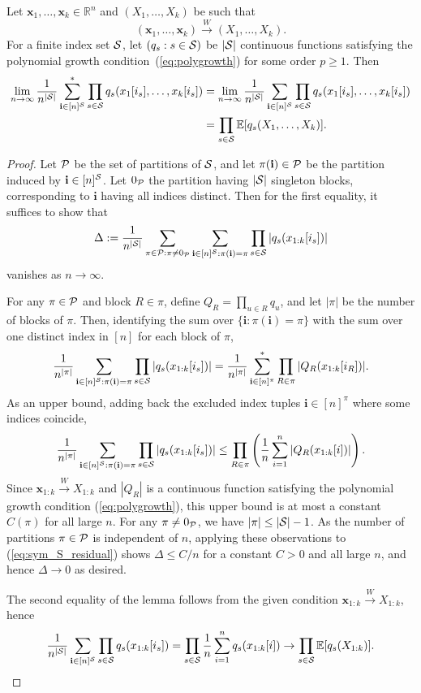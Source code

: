\documentclass[10pt,reqno]{amsart}
\def\x{\mathbf{x}}
\def\E{\mathbb{E}}
\def\R{\mathbb{R}}
\def\toW{\overset{W}{\to}}
\def\bi{\mathbf{i}}
\begin{document}
\begin{lemma}\label{lemma:distinctness}
Let $\x_1,\ldots,\x_k \in \R^n$ and $(X_1,\ldots,X_k)$ be such that
\[(\x_1,\ldots,\x_k) \toW (X_1,\ldots,X_k).\]
For a finite index set ${\mathcal{S}}$, let $(q_s:s \in {\mathcal{S}})$ be $|{\mathcal{S}}|$
continuous functions satisfying the polynomial
growth condition~(\ref{eq:polygrowth}) for some order $p \geq 1$. Then
\begin{align*}
\lim_{n \to \infty} \frac{1}{n^{|\cS|}}\sum_{\bi \in [n]^\cS}^*
\prod_{s \in \cS} q_s(x_1[i_s],\ldots,x_k[i_s])
&=\lim_{n \to \infty} \frac{1}{n^{|\cS|}}\sum_{\bi \in [n]^\cS}
\prod_{s \in \cS} q_s(x_1[i_s],\ldots,x_k[i_s])\\
&=\prod_{s \in \cS} \E[q_s(X_1,\ldots,X_k)].
\end{align*}
\end{lemma}
\begin{proof}
Let $\mathcal{P}$ be the set of partitions of ${\mathcal{S}}$, and let
$\pi(\bi) \in \cP$ be the partition induced by $\bi \in [n]^{\cS}$.
Let $0_{\mathcal{P}}$ the
partition having $|{\mathcal{S}}|$ singleton blocks, corresponding to $\bi$ having all
indices distinct. Then for the first equality, it suffices to show that
\begin{equation}\label{eq:sym_S_residual}
\Delta:=\frac{1}{n^{|\cS|}}
\sum_{\pi \in \cP: \pi \neq 0_{\cP}}
\sum_{\bi \in [n]^{\cS}:\pi(\bi)=\pi} \prod_{s \in \cS} |q_s(x_{1:k}[i_s])|
\end{equation}
vanishes as $n \to \infty$.

For any $\pi \in \mathcal{P}$ and block $R \in \pi$, define
$Q_R=\prod_{u \in R} q_u$, and let $|\pi|$ be the number of blocks of
$\pi$. Then, identifying the sum over $\{\bi:\pi(\bi)=\pi\}$ with the sum
over one distinct index in $[n]$ for each block of $\pi$,
\[\frac{1}{n^{|\pi|}} \sum_{\ib \in [n]^{\cS}:\pi(\bi)=\pi}
\prod_{s \in \cS} |q_s(x_{1:k}[i_s])|
=\frac{1}{n^{|\pi|}} \sum_{\bi \in [n]^\pi}^*
\prod_{R \in \pi} |Q_R(x_{1:k}[i_R])|.\]
As an upper bound, adding back the excluded index tuples $\bi \in [n]^{\pi}$
where some indices coincide,
\[\frac{1}{n^{|\pi|}} \sum_{\ib \in [n]^{\cS}:\pi(\bi)=\pi}
\prod_{s \in \cS} |q_s(x_{1:k}[i_s])|
\leq \prod_{R \in \pi} \left(\frac{1}{n}\sum_{i=1}^n |Q_R(x_{1:k}[i])|\right).\]
Since $\x_{1:k} \toW X_{1:k}$
and $|Q_R|$ is a continuous function satisfying the polynomial
growth condition (\ref{eq:polygrowth}),
this upper bound is at most a constant $C(\pi)$ for
all large $n$. For any $\pi \neq 0_{\mathcal{P}}$, we have $|\pi| \leq |{\mathcal{S}}|-1$.
As the number of partitions $\pi \in \mathcal{P}$ is independent of $n$, applying these
observations to (\ref{eq:sym_S_residual}) shows
$\Delta \leq C/n$ for a constant $C>0$ and all large $n$,
and hence $\Delta \to 0$ as desired.

The second equality of the lemma follows from the given condition $\x_{1:k} \toW 
X_{1:k}$, hence
\[\frac{1}{n^{|\cS|}}\sum_{\bi \in [n]^\cS}
\prod_{s \in \cS} q_s(x_{1:k}[i_s])=\prod_{s \in \cS} \frac{1}{n}\sum_{i=1}^n
q_s(x_{1:k}[i]) \to \prod_{s \in \cS} \E[q_s(X_{1:k})].\]
\end{proof}
\end{document}
